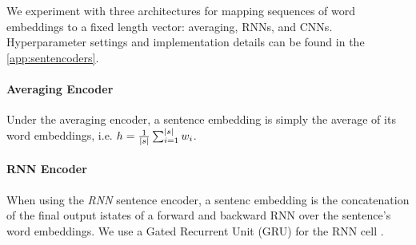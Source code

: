 

We experiment with three architectures for mapping sequences
of word embeddings to a fixed length vector: averaging, RNNs, and CNNs.
Hyperparameter settings and implementation details can be found 
in the \autoref{app:sentencoders}.

\paragraph{Averaging Encoder} Under the averaging encoder, a sentence embedding
\sentEmb is simply the average of its word embeddings, i.e. $\sentEmb = \frac{1}{\sentSize} \sum_{i=1}^{\sentSize} \wordEmb[i]$.


%

\paragraph{RNN Encoder} When using  the \textit{RNN} sentence encoder,
a sentenc embedding is the 
concatenation 
of the
final output istates of a forward and backward RNN over the sentence's word
embeddings. We use a Gated Recurrent Unit (GRU)  
for the RNN cell \cite{chung2014empirical}.

